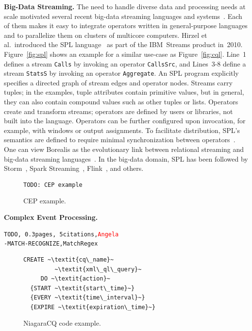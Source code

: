 \textbf{Big-Data Streaming.}
%
The need to handle diverse data and processing needs at scale
motivated several recent big-data streaming languages and
systems~\cite{carbone_et_al_2015,hirzel_schneider_gedik_2017,toshniwal_et_al_2014,zaharia_et_al_2013}.
Each of them makes it easy to integrate operators written in
general-purpose languages and to parallelize them on clusters of
multicore computers. Hirzel et al.\ introduced the SPL
language~\cite{hirzel_schneider_gedik_2017} as part of the IBM~Streams
product in~2010. Figure~\ref{fig:spl} shows an example for a similar
use-case as Figure~\ref{fig:cql}. Line~1 defines a stream
\lstinline{Calls} by invoking an operator \lstinline{CallsSrc}, and
\mbox{Lines 3-8} define a stream \lstinline{StatsS} by invoking an
operator \lstinline{Aggregate}. An SPL program explicitly specifies a
directed graph of stream edges and operator nodes. Streams carry
tuples; in the examples, tuple attributes contain primitive values,
but in general, they can also contain compound values such as other
tuples or lists.  Operators create and transform streams; operators
are defined by users or libraries, not built into the
language. Operators can be further configured upon invocation, for
example, with windows or output assignments. To facilitate
distribution, SPL's semantics are defined to require minimal
synchronization between operators~\cite{soule_et_al_2016}. One can
view Borealis as the evolutionary link between relational streaming
and big-data streaming languages~\cite{abadi_et_al_2005}. In the
big-data domain, SPL has been followed by
Storm~\cite{toshniwal_et_al_2014}, Spark
Streaming~\cite{zaharia_et_al_2013}, Flink~\cite{carbone_et_al_2015},
and others.

\begin{figure}[!h]
\begin{lstlisting}
TODO: CEP example
\end{lstlisting}
\vspace*{-4mm}
\caption{\label{fig:cep}CEP example.}
\end{figure}

\textbf{Complex Event Processing.}
\begin{alltt}TODO\scriptsize, ~0.3 pages, ~5 citations, \textcolor{red}{Angela}
- MATCH-RECOGNIZE \cite{zemke_et_al_2007}, MatchRegex \cite{hirzel_2012}
\end{alltt}

\begin{figure}[!h]
\begin{lstlisting}
CREATE ~\textit{cq\_name}~
         ~\textit{xml\_ql\_query}~
     DO ~\textit{action}~
  {START ~\textit{start\_time}~}
  {EVERY ~\textit{time\_interval}~}
  {EXPIRE ~\textit{expiration\_time}~}
\end{lstlisting}
\vspace*{-4mm}
\caption{\label{fig:Niagra}NiagaraCQ code example.}
\end{figure}

